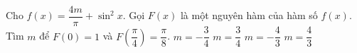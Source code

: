 \begin{ex}%
	Cho $f(x)=\dfrac{4m}{\pi}+\sin^2 x$. Gọi $F(x)$ là một nguyên hàm của hàm số $f(x)$. Tìm $m$ để $F(0)=1$ và $F\left(\dfrac{\pi}{4}\right)=\dfrac{\pi}{8}$.
	\choice%
	{\True $m=-\dfrac{3}{4}$}
	{$m=\dfrac{3}{4}$}
	{$m=-\dfrac{4}{3}$}
	{$m=\dfrac{4}{3}$}
\end{ex}

